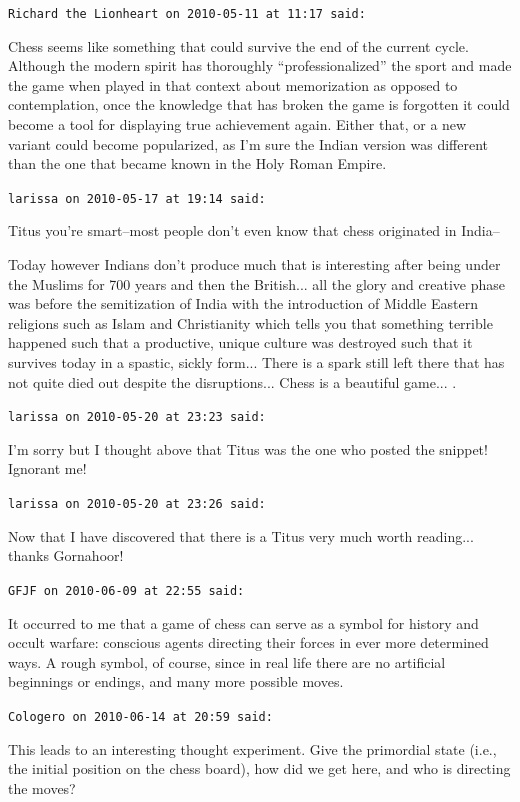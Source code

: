 \begin{footnotesize}
\begin{sffamily}
\texttt{Richard the Lionheart on 2010-05-11 at 11:17 said:}

Chess seems like something that could survive the end of the current cycle. Although the modern spirit has thoroughly ``professionalized'' the sport and made the game when played in that context about memorization as opposed to contemplation, once the knowledge that has broken the game is forgotten it could become a tool for displaying true achievement again. Either that, or a new variant could become popularized, as I'm sure the Indian version was different than the one that became known in the Holy Roman Empire.

\hfill

\texttt{larissa on 2010-05-17 at 19:14 said:}

Titus you're smart--most people don't even know that chess originated in India--

Today however Indians don't produce much that is interesting after being under the Muslims for 700 years and then the British... all the glory and creative phase was before the semitization of India with the introduction of Middle Eastern religions such as Islam and Christianity which tells you that something terrible happened such that a productive, unique culture was destroyed such that it survives today in a spastic, sickly form... There is a spark still left there that has not quite died out despite the disruptions... Chess is a beautiful game... .

\hfill

\texttt{larissa on 2010-05-20 at 23:23 said:}

I'm sorry but I thought above that Titus was the one who posted the snippet! Ignorant me!

\hfill

\texttt{larissa on 2010-05-20 at 23:26 said:}

Now that I have discovered that there is a Titus very much worth reading... thanks Gornahoor!

\hfill

\texttt{GFJF on 2010-06-09 at 22:55 said:}

It occurred to me that a game of chess can serve as a symbol for history and occult warfare: conscious agents directing their forces in ever more determined ways. A rough symbol, of course, since in real life there are no artificial beginnings or endings, and many more possible moves.

\hfill

\texttt{Cologero on 2010-06-14 at 20:59 said:}

This leads to an interesting thought experiment. Give the primordial state (i.e., the initial position on the chess board), how did we get here, and who is directing the moves?


\hfill

\end{sffamily}
\end{footnotesize}


